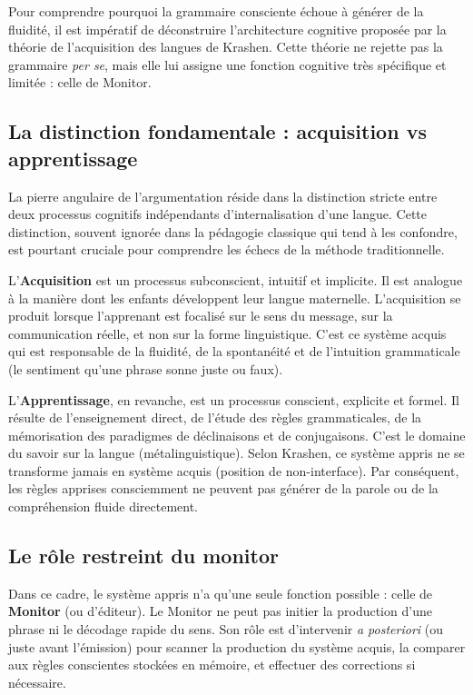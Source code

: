 Pour comprendre pourquoi la grammaire consciente échoue à générer de la fluidité, il est impératif
de déconstruire l'architecture cognitive proposée par la théorie de l'acquisition des langues de
Krashen. Cette théorie ne rejette pas la grammaire \textit{per se}, mais elle lui assigne une
fonction cognitive très spécifique et limitée : celle de \og Monitor\fg{}.



\subsection{La distinction fondamentale : acquisition vs apprentissage}

La pierre angulaire de l'argumentation réside dans la distinction stricte entre deux processus
cognitifs indépendants d'internalisation d'une langue. Cette distinction, souvent ignorée dans la
pédagogie classique qui tend à les confondre, est pourtant cruciale pour comprendre les échecs de la
méthode traditionnelle.

L'\textbf{Acquisition} est un processus subconscient, intuitif et implicite. Il est analogue à la
manière dont les enfants développent leur langue maternelle. L'acquisition se produit lorsque
l'apprenant est focalisé sur le sens du message, sur la communication réelle, et non sur la forme
linguistique. C'est ce système acquis qui est responsable de la fluidité, de la spontanéité et de
l'intuition grammaticale (le \og sentiment\fg{} qu'une phrase sonne juste ou
faux).\cite{II-2-3-ref4}

L'\textbf{Apprentissage}, en revanche, est un processus conscient, explicite et formel. Il résulte
de l'enseignement direct, de l'étude des règles grammaticales, de la mémorisation des paradigmes de
déclinaisons et de conjugaisons. C'est le domaine du \og savoir sur la langue\fg{}
(métalinguistique). Selon Krashen, ce système appris ne se transforme jamais en système acquis
(position de non-interface). Par conséquent, les règles apprises consciemment ne peuvent pas générer
de la parole ou de la compréhension fluide directement.\cite{II-2-3-ref6}



\subsection{Le rôle restreint du monitor}

Dans ce cadre, le système appris n'a qu'une seule fonction possible : celle de \textbf{Monitor} (ou
d'éditeur). Le Monitor ne peut pas initier la production d'une phrase ni le décodage rapide du sens.
Son rôle est d'intervenir \textit{a posteriori} (ou juste avant l'émission) pour scanner la
production du système acquis, la comparer aux règles conscientes stockées en mémoire, et effectuer
des corrections si nécessaire.\cite{II-2-3-ref8}

